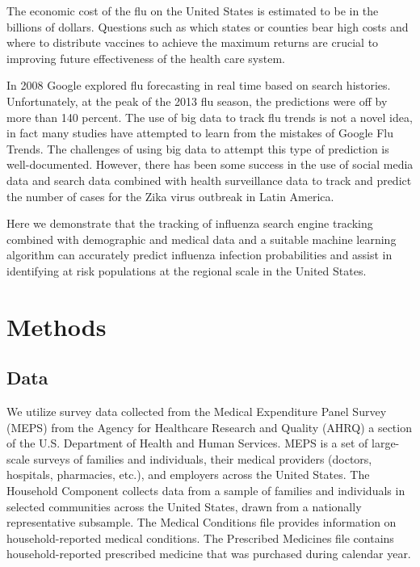 \documentclass[twoside,11pt]{article}
\begin{document}
The economic cost of the flu on the United States is estimated to be in the billions of dollars.  Questions such as which states or counties bear high costs and where to distribute vaccines to achieve the maximum returns are crucial to improving future effectiveness of the health care system.  

In 2008 Google explored flu forecasting in real time based on search histories.
Unfortunately, at the peak of the 2013 flu season, the predictions were off by
more than 140 percent. \citep{lazer_kennedy_king_vespignani_2014} The use of big
data to track flu trends is not a novel idea, in fact many studies have
attempted to learn from the mistakes of Google Flu Trends. The challenges of
using big data to attempt this type of prediction is well-documented.
\citep{lazer_kennedy_king_vespignani_2014} However, there has been some success in
the use of social media data and search data combined with health surveillance
data to track and predict the number of cases for the Zika virus outbreak in
Latin America. \citep{mcgough_brownstein_hawkins_santillana_2017} 

Here we demonstrate that the tracking of influenza search engine tracking
combined with demographic and medical data and a suitable machine learning
algorithm can accurately predict influenza infection probabilities \citep{ginsberg_2009} and assist in identifying at risk populations at the regional scale in the United States. 

\section{Methods}

\subsection*{Data}

We utilize survey data collected from the Medical Expenditure Panel Survey
(MEPS) from the Agency for Healthcare Research and Quality (AHRQ) a section of
the U.S. Department of Health and Human Services.  MEPS is a set of large-scale
surveys of families and individuals, their medical providers (doctors,
hospitals, pharmacies, etc.), and employers across the United States. The
Household Component collects data from a sample of families and individuals in
selected communities across the United States, drawn from a nationally
representative subsample.  The Medical Conditions file provides information on
household-reported medical conditions.  The Prescribed Medicines file contains
household-reported prescribed medicine that was purchased during calendar year. \citep{meps} 
\end{document}
